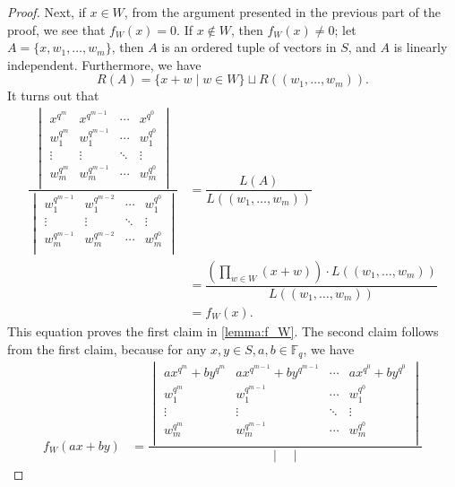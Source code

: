 \documentclass[12pt,a4paper]{report}
\theoremstyle{definition}
\theoremstyle{remark}
\theoremstyle{definition}
\begin{document}
\begin{proof}
    Next, if $x\in W$, from the argument presented in the previous part of the proof, we see that $f_W(x) = 0$. If $x\notin W$, then $f_W(x)\neq 0$; let $A = \{x, w_1, \ldots, w_m\}$, then $A$ is an ordered tuple of vectors in $S$, and $A$ is linearly independent. Furthermore, we have
    \begin{equation*}
        R(A) = \{x+w\mid w\in W\}\sqcup R((w_1, \ldots, w_m)).
    \end{equation*}
    It turns out that
    \begin{align*}
        \dfrac{\begin{vmatrix}
        x^{q^m} & x^{q^{m-1}} & \cdots & x^{q^0}\\
        w_1^{q^m} & w_1^{q^{m-1}} & \cdots & w_1^{q^0}\\
        \vdots & \vdots & \ddots  & \vdots\\
        w_m^{q^m} & w_m^{q^{m-1}} & \cdots & w_m^{q^0}\\
        \end{vmatrix}}{\begin{vmatrix}
        w_1^{q^{m-1}} & w_1^{q^{m-2}} & \cdots & w_1^{q^0}\\
        \vdots & \vdots & \ddots  & \vdots\\
        w_m^{q^{m-1}} & w_m^{q^{m-2}} & \cdots & w_m^{q^0}\\
        \end{vmatrix}} &= \dfrac{L(A)}{L((w_1, \ldots, w_m))} \\
        &=\dfrac{\left(\prod\limits_{w\in W}(x+w)\right) \cdot L((w_1, \ldots, w_m))}{L((w_1, \ldots, w_m))}\\
        &= f_W(x).
    \end{align*}
    This equation proves the first claim in \cref{lemma:f_W}. The second claim follows from the first claim, because for any $x, y\in S, a, b\in \mathbb{F}_q$, we have
    \begin{align*}
        f_W(ax+by) &= \dfrac{\begin{vmatrix}
        ax^{q^m} + by^{q^m} & ax^{q^{m-1}} + by^{q^{m-1}} & \cdots & ax^{q^0} + by^{q^0}\\
        w_1^{q^m} & w_1^{q^{m-1}} & \cdots & w_1^{q^0}\\
        \vdots & \vdots & \ddots  & \vdots\\
        w_m^{q^m} & w_m^{q^{m-1}} & \cdots & w_m^{q^0}\\
        \end{vmatrix}}{\begin{vmatrix}

\end{vmatrix}}
\end{align*}
\end{proof}
\end{document}
